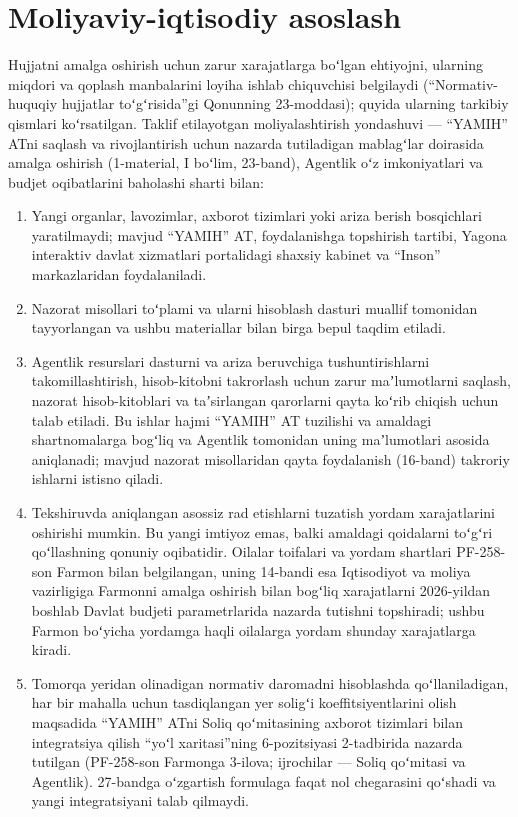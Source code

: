 \documentclass[14pt,a4paper]{extarticle}
\begin{document}
\section{Moliyaviy-iqtisodiy asoslash}\label{sec:fin}
Hujjatni amalga oshirish uchun zarur xarajatlarga boʻlgan ehtiyojni, ularning miqdori va qoplash manbalarini loyiha ishlab chiquvchisi belgilaydi (“Normativ-huquqiy hujjatlar toʻgʻrisida”gi Qonunning 23-moddasi\cite{orq682}); quyida ularning tarkibiy qismlari koʻrsatilgan. Taklif etilayotgan moliyalashtirish yondashuvi — “YAMIH” ATni saqlash va rivojlantirish uchun nazarda tutiladigan mablagʻlar doirasida amalga oshirish (1-material, I boʻlim, 23-band), Agentlik oʻz imkoniyatlari va budjet oqibatlarini baholashi sharti bilan:
\begin{enumerate}[leftmargin=1.27cm]
\item Yangi organlar, lavozimlar, axborot tizimlari yoki ariza berish bosqichlari yaratilmaydi; mavjud “YAMIH” AT, foydalanishga topshirish tartibi, Yagona interaktiv davlat xizmatlari portalidagi shaxsiy kabinet va “Inson” markazlaridan foydalaniladi.
\item Nazorat misollari toʻplami va ularni hisoblash dasturi muallif tomonidan tayyorlangan va ushbu materiallar bilan birga bepul taqdim etiladi.
\item Agentlik resurslari dasturni va ariza beruvchiga tushuntirishlarni takomillashtirish, hisob-kitobni takrorlash uchun zarur maʼlumotlarni saqlash, nazorat hisob-kitoblari va taʼsirlangan qarorlarni qayta koʻrib chiqish uchun talab etiladi. Bu ishlar hajmi “YAMIH” AT tuzilishi va amaldagi shartnomalarga bogʻliq va Agentlik tomonidan uning maʼlumotlari asosida aniqlanadi; mavjud nazorat misollaridan qayta foydalanish (16-band) takroriy ishlarni istisno qiladi.
\item Tekshiruvda aniqlangan asossiz rad etishlarni tuzatish yordam xarajatlarini oshirishi mumkin. Bu yangi imtiyoz emas, balki amaldagi qoidalarni toʻgʻri qoʻllashning qonuniy oqibatidir. Oilalar toifalari va yordam shartlari PF-258-son Farmon bilan belgilangan, uning 14-bandi esa Iqtisodiyot va moliya vazirligiga Farmonni amalga oshirish bilan bogʻliq xarajatlarni 2026-yildan boshlab Davlat budjeti parametrlarida nazarda tutishni topshiradi\cite{pf258}; ushbu Farmon boʻyicha yordamga haqli oilalarga yordam shunday xarajatlarga kiradi.
\item Tomorqa yeridan olinadigan normativ daromadni hisoblashda qoʻllaniladigan, har bir mahalla uchun tasdiqlangan yer soligʻi koeffitsiyentlarini olish maqsadida “YAMIH” ATni Soliq qoʻmitasining axborot tizimlari bilan integratsiya qilish “yoʻl xaritasi”ning 6-pozitsiyasi 2-tadbirida nazarda tutilgan (PF-258-son Farmonga 3-ilova; ijrochilar — Soliq qoʻmitasi va Agentlik)\cite{pf258}. 27-bandga oʻzgartish formulaga faqat nol chegarasini qoʻshadi va yangi integratsiyani talab qilmaydi.

\end{enumerate}
\end{document}
